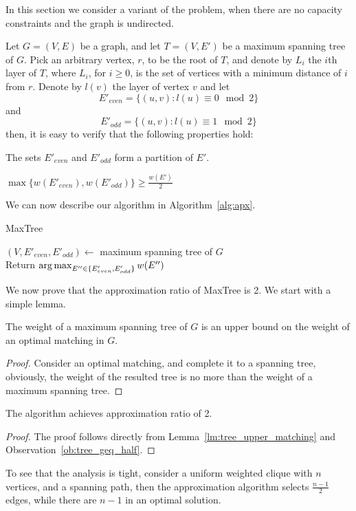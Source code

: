 \label{sub:ucudcm}
In this section we consider a variant of the problem, 
when there are no capacity constraints and the graph is undirected.

Let $G = (V, E)$ be a graph, 
and let $T = (V, E')$ be a maximum spanning tree of $G$.
Pick an arbitrary vertex, $r$, to be the root of $T$, 
and denote by $L_i$ the $i$th layer of $T$, 
where $L_i$, for $i \geq 0$, is the set of vertices with a minimum distance of $i$ from $r$.
Denote by $l(v)$ the layer of vertex $v$ and let 
$$ E'_{even} = \{ (u, v) : l(u) \equiv 0 \mod 2 \} $$
and    
$$ E'_{odd} = \{ (u, v) : l(u) \equiv 1 \mod 2 \} $$
then, it is easy to verify that the following properties hold:

\begin{observation}
The sets $E'_{even}$ and $E'_{odd}$ form a partition of $E'$. 
\end{observation}

\begin{observation}
\label{ob:tree_geq_half}
$ \max\{w(E'_{even}), w(E'_{odd})\}  \geq \frac{w(E')}{2} $
\end{observation}

We can now describe our algorithm in Algorithm~\ref{alg:apx}.

\begin{algorithm}
\label{alg:apx}
\caption{MaxTree}
$(V, E'_{even}, E'_{odd}) \leftarrow$ maximum spanning tree of $G$		\\
Return $\operatorname*{arg\,max}_{E'' \in \{ E'_{even}, E'_{odd} \}}{w(E'')} $	\\
\end{algorithm}

We now prove that the approximation ratio of MaxTree is 2.
We start with a simple lemma.

\begin{lemma}
\label{lm:tree_upper_matching}
The weight of a maximum spanning tree of $G$ is an upper bound on the weight of
an optimal matching in $G$.
\end{lemma}

\begin{proof}
Consider an optimal matching, and complete it to a spanning tree, obviously, the
weight of the resulted tree is no more than the weight of a maximum spanning
tree.
\end{proof}

\begin{theorem}
The \UCUDCARPOOL{} algorithm achi\-eves approximation ratio of 2.
\end{theorem}

\begin{proof}
The proof follows directly from 
Lemma~\ref{lm:tree_upper_matching} and Observation~\ref{ob:tree_geq_half}.
\end{proof}

To see that the analysis is tight, 
consider a uniform weighted clique with $n$ vertices, 
and a spanning path, 
then the approximation algorithm selects $\frac{n - 1}{2}$ edges, 
while there are $n - 1$ in an optimal solution.  